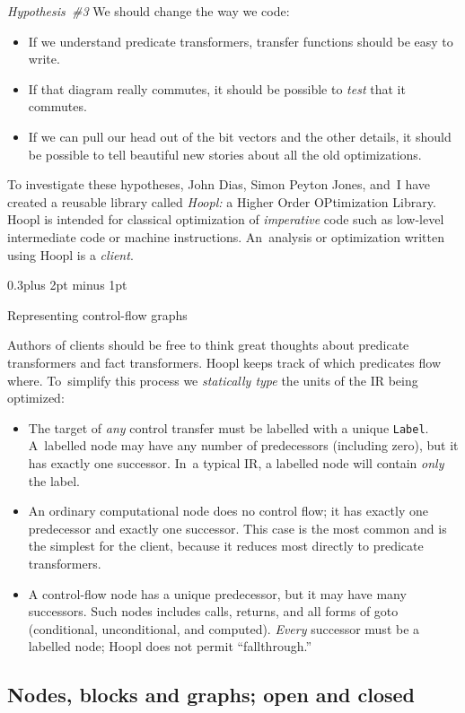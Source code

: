 \documentclass[twocolumn]{article}
\makeatletter
\newcommand\mysection[1]{%
  \par
  \vskip 0.5\baselineskip plus 2pt minus 1pt
  \noindent{\raggedright\textbf{#1}}
  \par
  \vskip 0.3\baselineskip plus 2pt minus 1pt
  \@afterindentfalse
}
\renewcommand\mysection[1]{%
  \@startsection{section}{1}{\z@}{-0.5\baselineskip plus -2pt minus -1pt}%
                                   {0.3\baselineskip plus 2pt minus 1pt}%
           {\normalfont\raggedright\bfseries}}
\makeatother
\begin{document}
\emph{Hypothesis~\#3\quad} 
We should change the way we
code:
\begin{itemize}
\item
If we understand predicate transformers, transfer functions should be
easy to write.
\item
If that diagram really commutes, it should be possible to \emph{test}
that it commutes.
\item
If we can pull our head out of the bit vectors and the other details,
it should be possible to tell beautiful new stories about all the old
optimizations.
\end{itemize}

To investigate these hypotheses, John Dias, Simon Peyton Jones, and~I
have created a reusable library called \emph{Hoopl:} a Higher Order
OPtimization Library.
Hoopl is intended for classical optimization of \emph{imperative} code
such as low-level intermediate code or machine instructions.
An~analysis or optimization written using Hoopl is a \emph{client}.

\mysection*{Representing control-flow graphs}

Authors of clients should be free to think great thoughts about
predicate transformers and fact transformers.
Hoopl keeps track of which predicates flow where.
To~simplify this process we \emph{statically type} the units of the IR
being optimized:
\begin{itemize}
\item
The target of \emph{any} control transfer must be labelled with a
unique \texttt{Label}.
A~labelled node may have any number of predecessors (including zero),
but it has exactly one successor.
In~a typical IR, a labelled node will contain \emph{only} the label.
\item
An ordinary computational node does no control flow; it has
exactly one predecessor and exactly one successor.
This case is the most common and is the simplest for the client,
because it reduces most directly to predicate transformers.
\item
A control-flow node has a unique predecessor, but it may have many
successors.
Such nodes includes calls, returns, and all forms of goto
(conditional, unconditional, and computed).
\emph{Every} successor must be a labelled node; Hoopl does not permit
``fallthrough.''
\end{itemize}

\subsection{Nodes, blocks and graphs; open and closed}
\end{document}
